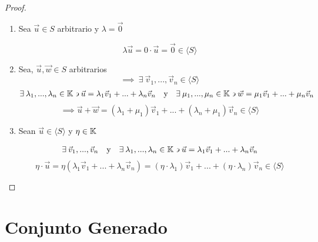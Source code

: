 \begin{proof}
    \begin{enumerate}[label={\roman*})]
        \item Sea $\vec{u} \in S$ arbitrario y $\lambda = \vec{0}$

        \begin{equation*}
            \lambda \vec{u} = 0 \cdot \vec{u} = \vec{0} \in \langle S \rangle
        \end{equation*}
        \item Sea, $\vec{u},\vec{w} \in S$ arbitrarios
        \begin{equation*}
            \implies \: \exists \: {\vec{v}}_{1},...,{\vec{v}}_{n} \in \langle S \rangle
        \end{equation*}
        \begin{align*}
          \exists \: {\lambda}_{1},...,{\lambda}_{n} \in \mathbb{K} \backepsilon  \vec{u} = {\lambda}_{1}{\vec{v}}_{1} + ... + {\lambda}_{n}{\vec{v}}_{n} & & \text{y} & &  \exists \: {\mu}_{1},...,{\mu}_{n} \in \mathbb{K} \backepsilon  \vec{w} = {\mu}_{1}{\vec{v}}_{1} + ... + {\mu}_{n}{\vec{v}}_{n}
        \end{align*}
        \begin{equation*}
            \implies \vec{u} +\vec{w} = ({\lambda}_{1}+{\mu}_{1}){\vec{v}}_{1}+...+({\lambda}_{n}+{\mu}_{1}){\vec{v}}_{n} \in \langle S \rangle
        \end{equation*}

        \item Sean $\vec{u} \in \langle S \rangle $ y $\eta \in \mathbb{K}$

        \begin{align*}
          \exists \: {\vec{v}}_{1}, ... ,{\vec{v}}_{n} & & \text{y} & &  \exists \: {\lambda}_{1},...,{\lambda}_{n} \in \mathbb{K} \backepsilon  \vec{u} = {\lambda}_{1}{\vec{v}}_{1} + ... + {\lambda}_{n}{\vec{v}}_{n}
        \end{align*}
        \begin{equation*}
            \eta \cdot \vec{u} = \eta ({\lambda}_{1}{\vec{v}}_{1} + ... + {\lambda}_{n}{\vec{v}}_{n}) = (\eta \cdot {\lambda}_{1}) {\vec{v}}_{1} + ... + (\eta \cdot {\lambda}_{n}) {\vec{v}}_{n} \in \langle S \rangle
        \end{equation*}
    \end{enumerate}
\end{proof}

\section{Conjunto Generado}


